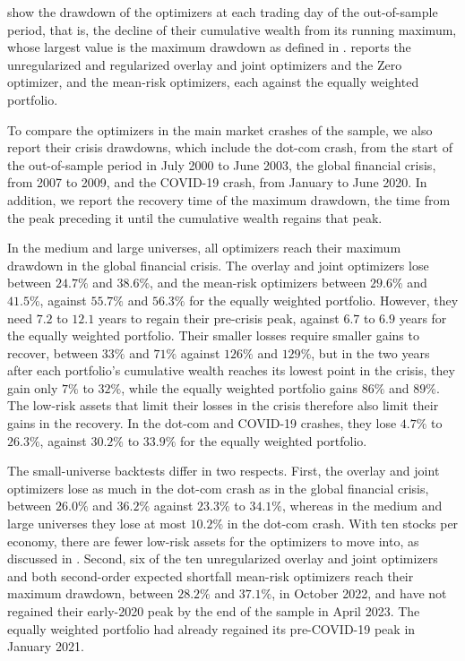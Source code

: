  show the drawdown of the optimizers at each trading day of the
out-of-sample period, that is, the decline of their cumulative wealth from its running maximum, whose largest value is
the maximum drawdown as defined in .  reports the
unregularized and regularized overlay and joint optimizers and the Zero optimizer, and 
the mean-risk optimizers, each against the equally weighted portfolio. 

To compare the optimizers in the main market
crashes of the sample, we also report their crisis drawdowns, which include the dot-com crash, from the start of the out-of-sample period in July 2000 to June 2003,
the global financial crisis, from 2007 to 2009, and the COVID-19 crash, from January to June 2020. In addition, we
report the recovery time of the maximum drawdown, the time from the peak preceding it until the cumulative wealth
regains that peak.

In the medium and large universes, all optimizers reach their maximum drawdown in the global financial crisis. The
overlay and joint optimizers lose between $24.7\%$ and $38.6\%$, and the mean-risk optimizers between $29.6\%$ and
$41.5\%$, against $55.7\%$ and $56.3\%$ for the equally weighted portfolio. However, they need $7.2$ to $12.1$ years to
regain their pre-crisis peak, against $6.7$ to $6.9$ years for the equally weighted portfolio. Their smaller losses
require smaller gains to recover, between $33\%$ and $71\%$ against $126\%$ and $129\%$, but in the two years after each portfolio's cumulative wealth reaches its lowest point in the
crisis, they gain only $7\%$ to $32\%$, while the equally weighted portfolio gains $86\%$ and $89\%$. The low-risk assets
that limit their losses in the crisis therefore also limit their gains in the recovery. In the dot-com and COVID-19
crashes, they lose $4.7\%$ to $26.3\%$, against $30.2\%$ to $33.9\%$ for
the equally weighted portfolio.

The small-universe backtests differ in two respects. First, the overlay and joint optimizers lose as much in the dot-com crash
as in the global financial crisis, between $26.0\%$ and $36.2\%$ against $23.3\%$ to $34.1\%$, whereas in the medium and
large universes they lose at most $10.2\%$ in the dot-com crash. With ten stocks per economy, there are fewer low-risk assets for the optimizers to move into, as
discussed in . Second, six of the ten unregularized overlay and joint optimizers and both
second-order expected shortfall mean-risk optimizers reach their maximum drawdown, between $28.2\%$ and $37.1\%$, in
October 2022, and have not regained their early-2020 peak by the end of the sample in April 2023. The equally weighted
portfolio had already regained its pre-COVID-19 peak in January 2021.

